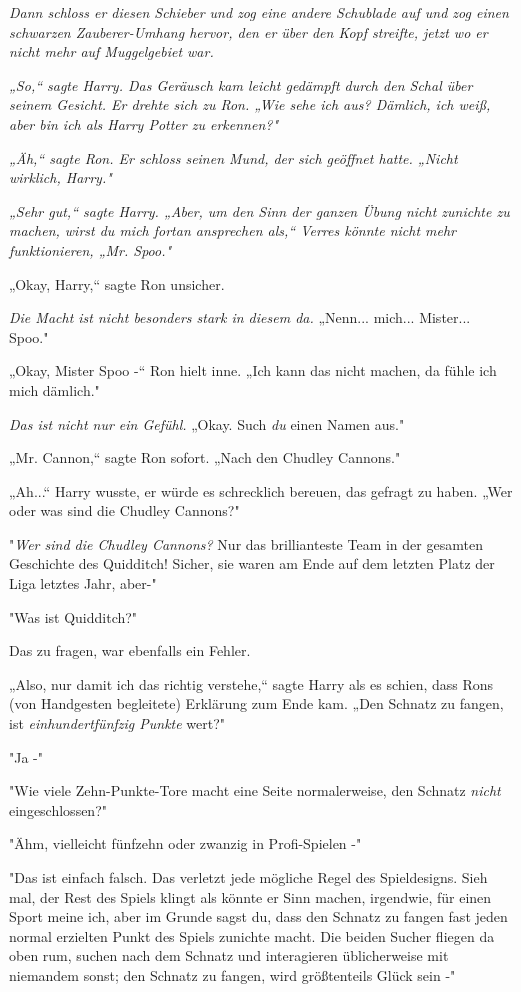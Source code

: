 {\emph{Dann schloss er diesen Schieber und zog eine andere Schublade auf und zog einen schwarzen Zauberer-Umhang hervor, den er über den Kopf streifte, jetzt wo er nicht mehr auf Muggelgebiet war.}

\emph{„So,“ sagte Harry. Das Geräusch kam leicht gedämpft durch den Schal über seinem Gesicht. Er drehte sich zu Ron. „Wie sehe ich aus? Dämlich, ich weiß, aber bin ich als Harry Potter zu erkennen?"}

\emph{„Äh,“ sagte Ron. Er schloss seinen Mund, der sich geöffnet hatte. „Nicht wirklich, Harry."}

\emph{„Sehr gut,“ sagte Harry. „Aber, um den Sinn der ganzen Übung nicht zunichte zu machen, wirst du mich fortan ansprechen als,“ Verres könnte nicht mehr funktionieren, „Mr. Spoo."}

„Okay, Harry,“ sagte Ron unsicher.

\emph{Die Macht ist nicht besonders stark in diesem da.} „Nenn... mich... Mister... Spoo."

„Okay, Mister Spoo -“ Ron hielt inne. „Ich kann das nicht machen, da fühle ich mich dämlich."

\emph{Das ist nicht nur ein Gefühl.} „Okay. Such \emph{du} einen Namen aus."

„Mr. Cannon,“ sagte Ron sofort. „Nach den Chudley Cannons."

„Ah...“ Harry wusste, er würde es schrecklich bereuen, das gefragt zu haben. „Wer oder was sind die Chudley Cannons?"

"\emph{Wer sind die Chudley Cannons?} Nur das brillianteste Team in der gesamten Geschichte des Quidditch! Sicher, sie waren am Ende auf dem letzten Platz der Liga letztes Jahr, aber-"

"Was ist Quidditch?"

Das zu fragen, war ebenfalls ein Fehler.

„Also, nur damit ich das richtig verstehe,“ sagte Harry als es schien, dass Rons (von Handgesten begleitete) Erklärung zum Ende kam. „Den Schnatz zu fangen, ist \emph{einhundertfünfzig Punkte} wert?"

"Ja -"

"Wie viele Zehn-Punkte-Tore macht eine Seite normalerweise, den Schnatz \emph{nicht} eingeschlossen?"

"Ähm, vielleicht fünfzehn oder zwanzig in Profi-Spielen -"

"Das ist einfach falsch. Das verletzt jede mögliche Regel des Spieldesigns. Sieh mal, der Rest des Spiels klingt als könnte er Sinn machen, irgendwie, für einen Sport meine ich, aber im Grunde sagst du, dass den Schnatz zu fangen fast jeden normal erzielten Punkt des Spiels zunichte macht. Die beiden Sucher fliegen da oben rum, suchen nach dem Schnatz und interagieren üblicherweise mit niemandem sonst; den Schnatz zu fangen, wird größtenteils Glück sein -"

}
